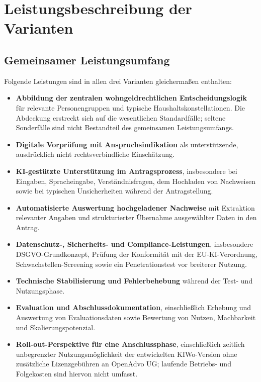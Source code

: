 \chapter{Leistungsbeschreibung der Varianten}

\section{Gemeinsamer Leistungsumfang}

Folgende Leistungen sind in allen drei Varianten gleichermaßen enthalten:

\begin{itemize}
  \item \textbf{Abbildung der zentralen wohngeldrechtlichen Entscheidungslogik} für relevante Personengruppen und typische Haushaltskonstellationen. Die Abdeckung erstreckt sich auf die wesentlichen Standardfälle; seltene Sonderfälle sind nicht Bestandteil des gemeinsamen Leistungsumfangs.
  \item \textbf{Digitale Vorprüfung mit Anspruchsindikation} als unterstützende, ausdrücklich nicht rechtsverbindliche Einschätzung.
  \item \textbf{KI-gestützte Unterstützung im Antragsprozess}, insbesondere bei Eingaben, Spracheingabe, Verständnisfragen, dem Hochladen von Nachweisen sowie bei typischen Unsicherheiten während der Antragstellung.
  \item \textbf{Automatisierte Auswertung hochgeladener Nachweise} mit Extraktion relevanter Angaben und strukturierter Übernahme ausgewählter Daten in den Antrag.
  \item \textbf{Datenschutz-, Sicherheits- und Compliance-Leistungen}, insbesondere DSGVO-Grundkonzept, Prüfung der Konformität mit der EU-KI-Verordnung, Schwachstellen-Screening sowie ein Penetrationstest vor breiterer Nutzung.
  \item \textbf{Technische Stabilisierung und Fehlerbehebung} während der Test- und Nutzungsphase.
  \item \textbf{Evaluation und Abschlussdokumentation}, einschließlich Erhebung und Auswertung von Evaluationsdaten sowie Bewertung von Nutzen, Machbarkeit und Skalierungspotenzial.
  \item \textbf{Roll-out-Perspektive für eine Anschlussphase}, einschließlich zeitlich unbegrenzter Nutzungsmöglichkeit der entwickelten KIWo-Version ohne zusätzliche Lizenzgebühren an OpenAdvo UG; laufende Betriebs- und Folgekosten sind hiervon nicht umfasst.
\end{itemize}


